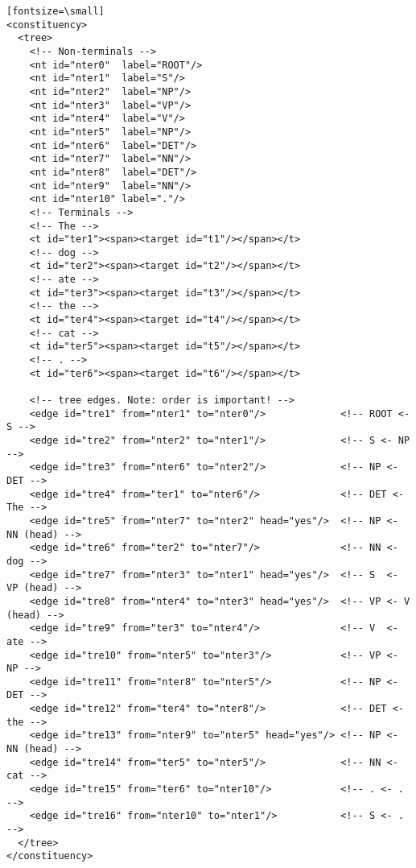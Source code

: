 \begin{verbatim}[fontsize=\small]
<constituency>
  <tree>
    <!-- Non-terminals -->
    <nt id="nter0"  label="ROOT"/>
    <nt id="nter1"  label="S"/>
    <nt id="nter2"  label="NP"/>
    <nt id="nter3"  label="VP"/>
    <nt id="nter4"  label="V"/>
    <nt id="nter5"  label="NP"/>
    <nt id="nter6"  label="DET"/>
    <nt id="nter7"  label="NN"/>
    <nt id="nter8"  label="DET"/>
    <nt id="nter9"  label="NN"/>
    <nt id="nter10" label="."/>
    <!-- Terminals -->
    <!-- The -->
    <t id="ter1"><span><target id="t1"/></span></t>
    <!-- dog -->
    <t id="ter2"><span><target id="t2"/></span></t>
    <!-- ate -->
    <t id="ter3"><span><target id="t3"/></span></t>
    <!-- the -->
    <t id="ter4"><span><target id="t4"/></span></t>
    <!-- cat -->
    <t id="ter5"><span><target id="t5"/></span></t>
    <!-- . -->
    <t id="ter6"><span><target id="t6"/></span></t>

    <!-- tree edges. Note: order is important! -->
    <edge id="tre1" from="nter1" to="nter0"/>             <!-- ROOT <- S -->
    <edge id="tre2" from="nter2" to="nter1"/>             <!-- S <- NP -->
    <edge id="tre3" from="nter6" to="nter2"/>             <!-- NP <- DET -->
    <edge id="tre4" from="ter1" to="nter6"/>              <!-- DET <- The -->
    <edge id="tre5" from="nter7" to="nter2" head="yes"/>  <!-- NP <- NN (head) -->
    <edge id="tre6" from="ter2" to="nter7"/>              <!-- NN <- dog -->
    <edge id="tre7" from="nter3" to="nter1" head="yes"/>  <!-- S  <- VP (head) -->
    <edge id="tre8" from="nter4" to="nter3" head="yes"/>  <!-- VP <- V (head) -->
    <edge id="tre9" from="ter3" to="nter4"/>              <!-- V  <- ate -->
    <edge id="tre10" from="nter5" to="nter3"/>            <!-- VP <- NP -->
    <edge id="tre11" from="nter8" to="nter5"/>            <!-- NP <- DET -->
    <edge id="tre12" from="ter4" to="nter8"/>             <!-- DET <- the -->
    <edge id="tre13" from="nter9" to="nter5" head="yes"/> <!-- NP <- NN (head) -->
    <edge id="tre14" from="ter5" to="nter5"/>             <!-- NN <- cat -->
    <edge id="tre15" from="ter6" to="nter10"/>            <!-- . <- . -->
    <edge id="tre16" from="nter10" to="nter1"/>           <!-- S <- . -->
  </tree>
</constituency>
\end{verbatim}



